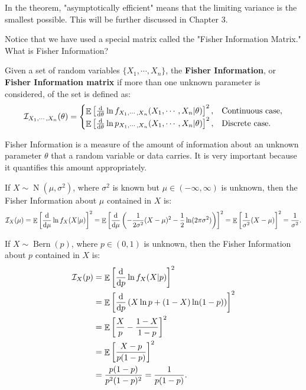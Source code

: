 \documentclass{huhtakm-template-book-v2}
\DeclareMathOperator{\E}{\mathbb{E}}
\DeclareMathOperator{\Bern}{Bern}
\DeclareMathOperator{\N}{N}
\begin{document}
    \begin{rem}
        In the theorem, "asymptotically efficient" means that the limiting variance is the smallest possible. This will be further discussed in Chapter 3.
    \end{rem}
    Notice that we have used a special matrix called the "Fisher Information Matrix." What is Fisher Information?
    \begin{defn}
        Given a set of random variables $\{X_{1}, \cdots, X_{n}\}$, the \textbf{Fisher Information}, or \textbf{Fisher Information matrix} if more than one unknown parameter is considered, of the set is defined as:
        \begin{equation*}
            \mathcal{I}_{X_{1}, \cdots, X_{n}}(\theta) = \begin{cases}
                \E\left[\odv*{}{\theta} \ln{f_{X_{1}, \cdots, X_{n}}(X_{1}, \cdots, X_{n} | \theta)}\right]^{2}, &\text{Continuous case},\\
                \E\left[\odv*{}{\theta} \ln{p_{X_{1}, \cdots, X_{n}}(X_{1}, \cdots, X_{n} | \theta)}\right]^{2}, &\text{Discrete case}.
            \end{cases}
        \end{equation*}
    \end{defn}
    \begin{rem}
        Fisher Information is a measure of the amount of information about an unknown parameter $\theta$ that a random variable or data carries. It is very important because it quantifies this amount appropriately.
    \end{rem}
    \begin{eg}
        If $X \sim \N(\mu, \sigma^{2})$, where $\sigma^{2}$ is known but $\mu \in (-\infty, \infty)$ is unknown, then the Fisher Information about $\mu$ contained in $X$ is:
        \begin{equation*}
            \mathcal{I}_{X}(\mu) = \E\left[\odv*{\ln{f_{X}(X | \mu)}}{\mu}\right]^{2} = \E\left[\odv*{}{\mu}\left(-\frac{1}{2\sigma^{2}}(X - \mu)^{2} - \frac{1}{2}\ln(2\pi\sigma^{2})\right)\right]^{2} = \E\left[\frac{1}{\sigma^{2}}(X - \mu)\right]^{2} = \frac{1}{\sigma^{2}}.
        \end{equation*}
    \end{eg}
    \begin{eg}
        If $X \sim \Bern(p)$, where $p \in (0, 1)$ is unknown, then the Fisher Information about $p$ contained in $X$ is:
        \begin{align*}
            \mathcal{I}_{X}(p) &= \E\left[\odv*{\ln{f_{X}(X | p)}}{p}\right]^{2}\\
            &= \E\left[\odv*{}{p}\left(X\ln{p} + (1 - X)\ln(1 - p)\right)\right]^{2}\\
            &= \E\left[\frac{X}{p} - \frac{1 - X}{1 - p}\right]^{2}\\
            &= \E\left[\frac{X - p}{p(1 - p)}\right]^{2}\\
            &= \frac{p(1 - p)}{p^{2}(1 - p)^{2}} = \frac{1}{p(1 - p)}.
        \end{align*}
    \end{eg}
    \newpage
\end{document}
